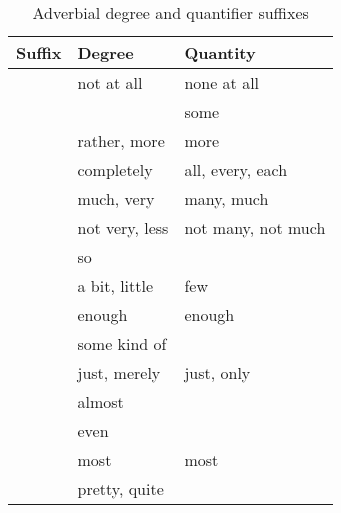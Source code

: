 \begin{table}[tp]\centering
\caption{Adverbial degree and quantifier suffixes}
\begin{tabu} to \linewidth {X X X}
\toprule\tableheaderfont
Suffix
	& Degree
	& Quantity
	\\

\toprule
	
	& not at all
	& none at all
	\\

	& 
	& some
	\\

	& rather, more
	& more
	\\
	
	& completely
	& all, every, each
	\\

	& much, very
	& many, much
	\\
	
	& not very, less
	& not many, not much
	\\
	
	& so
	&
	\\
	
	& a bit, little
	& few
	\\

	& enough
	& enough
	\\

	& some kind of
	&
	\\

	& just, merely
	& just, only
	\\
	
	& almost
	&
	\\

	& even
	&
	\\
	
	& most
	& most
	\\

	& pretty, quite
	&
	\\

\bottomrule
\end{tabu}
\label{tab:quantifiers}
\end{table}

